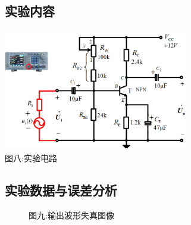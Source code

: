 \documentclass[a4paper]{article}
\begin{document}
    \subsection{实验内容}\label{subsec:18}
    \begin{center}
        \includegraphics[height=150pt]{exp5}\\
        {\small 图八:实验电路}
    \end{center}

    \subsection{实验数据与误差分析}\label{subsec:19}
    \begin{figure}[htb]
        \centering
        {\small 图九:输出波形失真图像}
    \end{figure}
\end{document}
